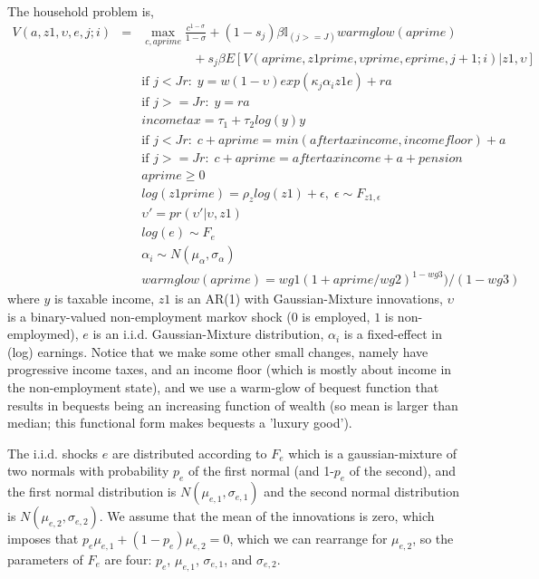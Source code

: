The household problem is,
\begin{eqnarray*}
 V(a,z1,\upsilon,e,j;i)&=& \max_{c,aprime} \frac{c^{1-\sigma}}{1-\sigma} + (1-s_j)\beta  \mathbb{I}_{(j>=J)} warmglow(aprime)  \\
 && \quad \quad \quad \quad+ s_j \beta E[V(aprime,z1prime,\upsilon prime,eprime,j+1;i)|z1,\upsilon] \\
&& \text{if }j<Jr: \; y=w (1-\upsilon) exp(\kappa_j \alpha_i z1 e) + ra \\
&& \text{if }j>=Jr: \; y=ra\\
&& incometax=\tau_1 + \tau_2 log(y) y\\
&& \text{if }j<Jr: \; c+aprime=min(aftertaxincome,incomefloor) + a \\
&& \text{if }j>=Jr: \; c+aprime=aftertaxincome + a +pension\\
&& aprime\geq 0 \\
&& log(z1prime)=\rho_{z} log(z1) + \epsilon, \; \epsilon \sim F_{z1,\epsilon} \\
&& \upsilon'=pr(\upsilon'|\upsilon,z1) \\
&& log(e) \sim F_e \\
&& \alpha_i \sim N(\mu_{\alpha},\sigma_{\alpha}) \\
&& warmglow(aprime)=wg1 (1+aprime/wg2)^{1-wg3})/(1-wg3)
\end{eqnarray*}
where $y$ is taxable income, $z1$ is an AR(1) with Gaussian-Mixture innovations, $\upsilon$ is a binary-valued non-employment markov shock ($0$ is employed, $1$ is non-employmed), $e$ is an i.i.d. Gaussian-Mixture distribution, $\alpha_i$ is a fixed-effect in (log) earnings. Notice that we make some other small changes, namely have progressive income taxes, and an income floor (which is mostly about income in the non-employment state), and we use a warm-glow of bequest function that results in bequests being an increasing function of wealth (so mean is larger than median; this functional form makes bequests a 'luxury good').

The i.i.d. shocks $e$ are distributed according to $F_e$ which is a gaussian-mixture of two normals with probability $p_e$ of the first normal (and 1-$p_e$ of the second), and the first normal distribution is $N(\mu_{e,1}, \sigma_{e,1})$ and the second normal distribution is $N(\mu_{e,2}, \sigma_{e,2})$. We assume that the mean of the innovations is zero, which imposes that $p_e \mu_{e,1}+ (1-p_e)\mu_{e,2}=0$, which we can rearrange for $\mu_{e,2}$, so the parameters of $F_e$ are four: $p_e$, $\mu_{e,1}$, $\sigma_{e,1}$, and  $\sigma_{e,2}$.

